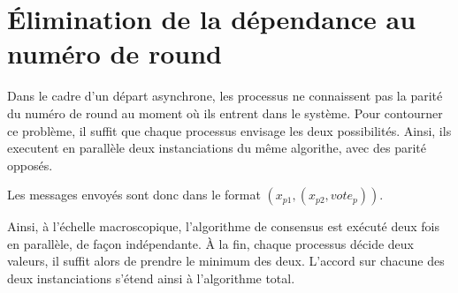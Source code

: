 \documentclass{article}
\begin{document}
\section{Élimination de la dépendance au numéro de round}

Dans le cadre d'un départ asynchrone, les processus ne connaissent pas la parité du numéro de round au moment où ils entrent dans le système. Pour contourner ce problème, il suffit que chaque processus envisage les deux possibilités. Ainsi, ils executent en parallèle deux instanciations du même algorithe, avec des parité opposés.

Les messages envoyés sont donc dans le format $(x_{p1}, (x_{p2}, vote_p))$.

Ainsi, à l'échelle macroscopique, l'algorithme de consensus est exécuté deux fois en parallèle, de façon indépendante. À la fin, chaque processus décide deux valeurs, il suffit alors de prendre le minimum des deux. L'accord sur chacune des deux instanciations s'étend ainsi à l'algorithme total.
\end{document}
